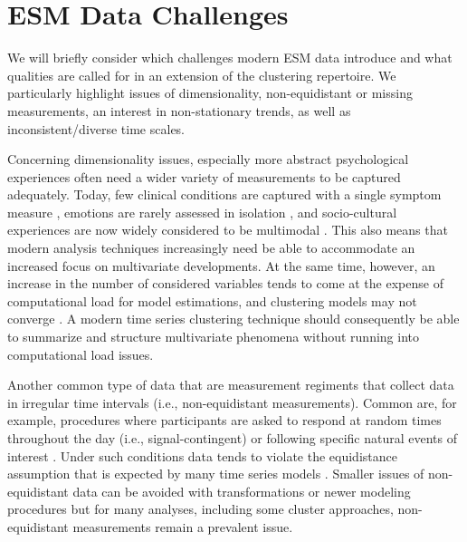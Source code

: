 \documentclass[man, 12pt, a4paper, mask, floatsintext]{apa7}
\theoremstyle{break}
\theoremstyle{plain}
\begin{document}
%




\printbibliography

\appendix

\section{ESM Data Challenges}
\label{app:ChallengesAppendix}
We will briefly consider which challenges modern ESM data introduce and what qualities are called for in an extension of the clustering repertoire. We particularly highlight issues of dimensionality, non-equidistant or missing measurements, an interest in non-stationary trends, as well as inconsistent/diverse time scales. 

Concerning dimensionality issues, especially more abstract psychological experiences often need a wider variety of measurements to be captured adequately. Today, few clinical conditions are captured with a single symptom measure \citep[e.g.,][]{cramer2016}, emotions are rarely assessed in isolation \citep[e.g.,][]{reitsema2022}, and socio-cultural experiences are now widely considered to be multimodal \citep[e.g.,][]{Kreienkamp2022d}. This also means that modern analysis techniques increasingly need be able to accommodate an increased focus on multivariate developments. At the same time, however, an increase in the number of considered variables tends to come at the expense of computational load for model estimations, and clustering models may not converge \citep[the aforementioned dimensionality curse;][]{altman2018}. A modern time series clustering technique should consequently be able to summarize and structure multivariate phenomena without running into computational load issues.

Another common type of data that are measurement regiments that collect data in irregular time intervals (i.e., non-equidistant measurements). Common are, for example, procedures where participants are asked to respond at random times throughout the day (i.e., signal-contingent) or following specific natural events of interest \citep[i.e., event-contingent; see][]{shiffman2008, myin-germeys2018}. Under such conditions data tends to violate the equidistance assumption that is expected by many time series models \citep[][]{hamaker2017}. Smaller issues of non-equidistant data can be avoided with transformations \citep[e.g., dynamic time warping,][]{berndt1994} or newer modeling procedures \citep[e.g., continuous-time models;][]{dehaan-rietdijk2017} but for many analyses, including some cluster approaches, non-equidistant measurements remain a prevalent issue. 
\end{document}
